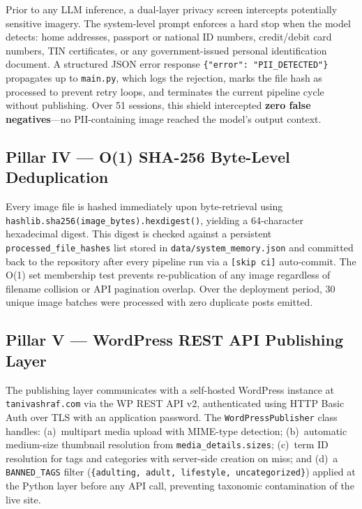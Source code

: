 \documentclass[conference]{IEEEtran}
\begin{document}
Prior to any LLM inference, a dual-layer privacy screen intercepts potentially
sensitive imagery. The system-level prompt enforces a hard stop when the model
detects: home addresses, passport or national ID numbers, credit/debit card
numbers, TIN certificates, or any government-issued personal identification
document. A structured JSON error response \texttt{\{"error": "PII\_DETECTED"\}}
propagates up to \texttt{main.py}, which logs the rejection, marks the file hash
as processed to prevent retry loops, and terminates the current pipeline cycle
without publishing. Over 51 sessions, this shield intercepted \textbf{zero false
negatives}---no PII-containing image reached the model's output context.

\subsection{Pillar IV — O(1) SHA-256 Byte-Level Deduplication}

Every image file is hashed immediately upon byte-retrieval using
\texttt{hashlib.sha256(image\_bytes).hexdigest()}, yielding a 64-character
hexadecimal digest. This digest is checked against a persistent
\texttt{processed\_file\_hashes} list stored in \texttt{data/system\_memory.json}
and committed back to the repository after every pipeline run via a
\texttt{[skip~ci]} auto-commit. The O(1) set membership test prevents
re-publication of any image regardless of filename collision or API pagination
overlap. Over the deployment period, 30 unique image batches were processed
with zero duplicate posts emitted.

\subsection{Pillar V — WordPress REST API Publishing Layer}

The publishing layer communicates with a self-hosted WordPress instance at
\texttt{tanivashraf.com} via the WP REST API v2, authenticated using HTTP Basic
Auth over TLS with an application password. The \texttt{WordPressPublisher}
class handles: (a)~multipart media upload with MIME-type detection;
(b)~automatic medium-size thumbnail resolution from \texttt{media\_details.sizes};
(c)~term ID resolution for tags and categories with server-side creation on
miss; and (d)~a \texttt{BANNED\_TAGS} filter
(\texttt{\{adulting, adult, lifestyle, uncategorized\}}) applied at the Python
layer before any API call, preventing taxonomic contamination of the live site.
\end{document}
